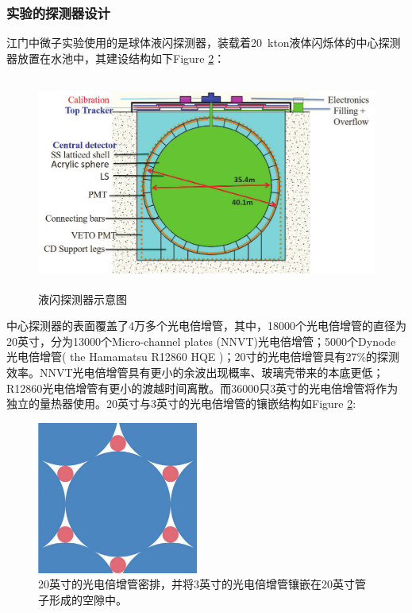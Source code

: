 \documentclass[10pt,a4paper]{article}
\begin{document}
\subsubsection{实验的探测器设计}\label{sub:4}

江门中微子实验使用的是球体液闪探测器，装载着\SI{20}{kton}液体闪烁体的中心探测器放置在水池中，其建设结构如下Figure \ref{fig:3}：\cite{Ludhova:2020vxz}
\begin{figure}[H]
 \centering
 \includegraphics[height=7cm]{images/探测器示意图.png}
 \caption{液闪探测器示意图}
 \label{fig:3}
\end{figure}

中心探测器的表面覆盖了4万多个光电倍增管，其中，18000个光电倍增管的直径为20英寸，分为13000个Micro-channel plates (NNVT)光电倍增管；5000个Dynode光电倍增管( the Hamamatsu R12860 HQE )；20寸的光电倍增管具有27\%的探测效率。NNVT光电倍增管具有更小的余波出现概率、玻璃壳带来的本底更低；R12860光电倍增管有更小的渡越时间离散。\cite{Steiger:2019khq}而36000只3英寸的光电倍增管将作为独立的量热器使用。20英寸与3英寸的光电倍增管的镶嵌结构如Figure \ref{fig:3}:
\begin{figure}[H]
 \centering
 \includegraphics[height=5cm]{images/PMTsyt.png}
 \caption{20英寸的光电倍增管密排，并将3英寸的光电倍增管镶嵌在20英寸管子形成的空隙中。\cite{Zhang:2017ewk}}
 \label{fig:3}
\end{figure}
\end{document}
